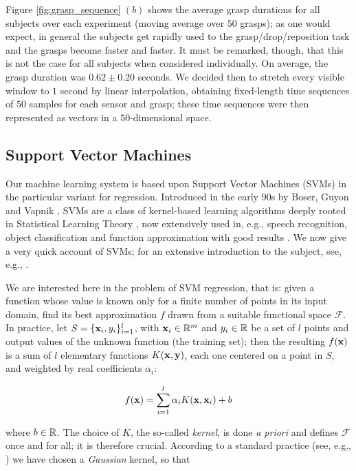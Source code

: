 Figure \ref{fig:grasp_sequence} $(b)$ shows the average grasp
durations for all subjects over each experiment (moving average over
$50$ grasps); as one would expect, in general the subjects get rapidly
used to the grasp/drop/reposition task and the grasps become faster
and faster. It must be remarked, though, that this is not the case for
all subjects when considered individually. On average, the grasp
duration was $0.62 \pm 0.20$ seconds. We decided then to stretch every
visible window to $1$ second by linear interpolation, obtaining
fixed-length time sequences of $50$ samples for each sensor and grasp;
these time sequences were then represented as vectors in a
$50$-dimensional space.

\subsection{Support Vector Machines}

Our machine learning system is based upon Support Vector Machines
(SVMs) in the particular variant for regression. 
Introduced in the early 90s by Boser, Guyon and Vapnik \cite{BGV92}, 
SVMs are a class of kernel-based learning algorithms
deeply rooted in Statistical Learning Theory \cite{v-edbed-82}, now
extensively used in, e.g., speech recognition, object classification
and function approximation with good results \cite{Cristianini00}. We
now give a very quick account of SVMs; for an extensive introduction
to the subject, see, e.g., \cite{SmolaTut2004}.

We are interested here in the problem of SVM regression, that is:
given a function whose value is known only for a finite number of
points in its input domain, find its best approximation $f$ drawn from
a suitable functional space $\mathcal{F}$. In practice, let
$S=\{\mathbf{x}_i,y_i\}_{i=1}^l$, with $\mathbf{x}_i \in \mathbb{R}^m$ and $y_i \in \mathbb{R}$ be
a set of $l$ points and output values of the unknown function
(the training set); then the resulting $f(\mathbf{x})$ is a sum of
$l$ elementary functions $K(\mathbf{x},\mathbf{y})$, each one centered on a point in
$S$, and weighted by real coefficients $\alpha_i$:

\begin{equation} \label{eqn:sol}
  f(\mathbf{x}) = \sum_{i=1}^l \alpha_i K(\mathbf{x},\mathbf{x}_i) + b
\end{equation}

\noindent where $b \in \mathbb{R}$. The choice of $K$, the so-called
\emph{kernel}, is done \emph{a priori} and defines $\mathcal{F}$
once and for all; it is therefore crucial. According to a standard
practice (see, e.g., \cite{Cristianini00}) we have chosen a
\emph{Gaussian} kernel, so that

